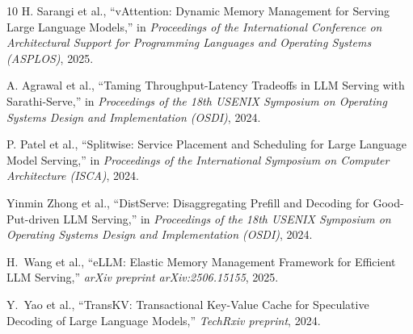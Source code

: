 \documentclass[conference,10pt]{IEEEtran}
\begin{document}
\begin{thebibliography}{10}
H. Sarangi et al., ``vAttention: Dynamic Memory Management for Serving Large Language Models,'' in \emph{Proceedings of the International Conference on Architectural Support for Programming Languages and Operating Systems (ASPLOS)}, 2025.

A. Agrawal et al., ``Taming Throughput-Latency Tradeoffs in LLM Serving with Sarathi-Serve,'' in \emph{Proceedings of the 18th USENIX Symposium on Operating Systems Design and Implementation (OSDI)}, 2024.

P. Patel et al., ``Splitwise: Service Placement and Scheduling for Large Language Model Serving,'' in \emph{Proceedings of the International Symposium on Computer Architecture (ISCA)}, 2024.

Yinmin Zhong et al., ``DistServe: Disaggregating Prefill and Decoding for Good-Put-driven LLM Serving,'' in \emph{Proceedings of the 18th USENIX Symposium on Operating Systems Design and Implementation (OSDI)}, 2024.

H.~Wang et al., ``eLLM: Elastic Memory Management Framework for Efficient LLM Serving,'' \emph{arXiv preprint arXiv:2506.15155}, 2025.

Y.~Yao et al., ``TransKV: Transactional Key-Value Cache for Speculative Decoding of Large Language Models,'' \emph{TechRxiv preprint}, 2024.

\end{thebibliography}
\end{document}
